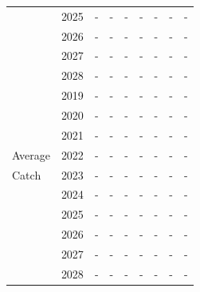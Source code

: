 \documentclass[12pt,]{article}
\begin{document}
\begin{table}[ht]
{\begin{tabular}{l|cc|>{\centering}p{.7in}c|>{\centering}p{.7in}c|>{\centering}p{.7in}c}
   & 2025 & - & - & - & - & - & - & - \\ 
   & 2026 & - & - & - & - & - & - & - \\ 
   & 2027 & - & - & - & - & - & - & - \\ 
   & 2028 & - & - & - & - & - & - & - \\ 
   \hline
 & 2019 & - & - & - & - & - & - & - \\ 
   & 2020 & - & - & - & - & - & - & - \\ 
   & 2021 & - & - & - & - & - & - & - \\ 
  Average & 2022 & - & - & - & - & - & - & - \\ 
  Catch & 2023 & - & - & - & - & - & - & - \\ 
   & 2024 & - & - & - & - & - & - & - \\ 
   & 2025 & - & - & - & - & - & - & - \\ 
   & 2026 & - & - & - & - & - & - & - \\ 
   & 2027 & - & - & - & - & - & - & - \\ 
   & 2028 & - & - & - & - & - & - & - \\ 
   \hline
\end{tabular}
}
\end{table}
\end{document}

